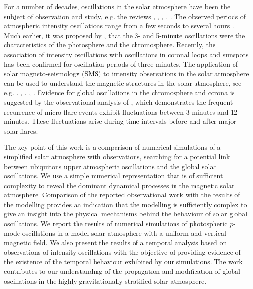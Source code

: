 \documentclass[physics,article,submit,pdftex,moreauthors]{Definitions/mdpi}
\begin{document}
 For a number of decades, oscillations in the solar atmosphere have been the subject of observation and study, e.g. the reviews \cite{Banerjee2011}, \cite{deMoortel2009}, \cite{Mathioudakis2013}, \cite{Ruderman2009}, \cite{Wang2011}. The observed periods of atmospheric intensity oscillations range from  a few seconds to several hours \cite{Auchere2014}. Much earlier, it was proposed by \cite{Jensen1963}, that the 3- and 5-minute oscillations were the characteristics of the photosphere and the chromosphere. Recently, the association of intensity oscillations with oscillations in coronal loops and sunspots has been confirmed for oscillation periods of three minutes. The application of solar magneto-seismology (SMS) to intensity observations in the solar atmosphere can be used to understand the magnetic structures in the solar atmosphere, see e.g. \cite{Roberts1984}, \cite{Banerjee2007}, \cite{Zaqarashvili2007}, \cite{Erdelyi2008}, \cite{Verth2010}.  Evidence for global oscillations  in the chromosphere and corona is suggested by the observational analysis of \cite{Gyenge2018},  which demonstrates the frequent recurrence of micro-flare events exhibit fluctuations between 3 minutes and 12 minutes. These fluctuations arise during time intervals before and after major solar flares.


The key point of this work is a comparison of numerical simulations  of a simplified solar atmosphere with observations, searching for a  potential link between ubiquitous upper atmospheric oscillations and the global solar oscillations. We use a  simple numerical representation that is of sufficient complexity to reveal the dominant dynamical processes in the magnetic solar atmosphere. Comparison of the reported observational work with the results of the modelling provides an indication that the modelling is sufficiently complex to give an insight into the physical mechanisms behind the behaviour of solar global oscillations. We report the results of numerical simulations of photospheric $p$-mode oscillations in a model solar atmosphere with a uniform and vertical magnetic field. We also present the results of a temporal analysis based on observations of intensity oscillations with the objective of providing evidence of the existence of the temporal behaviour exhibited by our simulations. The work contributes to our understanding of the propagation and modification of global oscillations in the highly gravitationally stratified solar atmosphere. 




\end{document}
